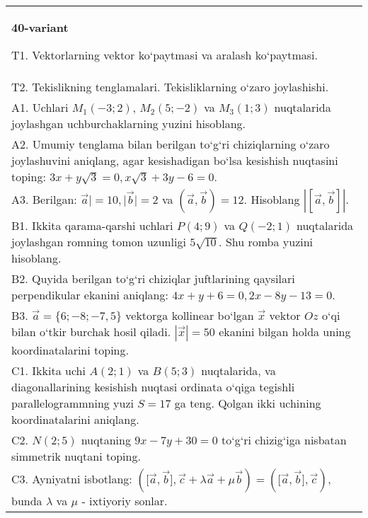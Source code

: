 \documentclass{article}
\begin{document}
\begin{tabular}{m{17cm}}
\textbf{40-variant}
\newline

T1. 
Vektorlarning vektor ko‘paytmasi va aralash ko‘paytmasi.
 \\
T2. 
Tekislikning tenglamalari. Tekisliklarning o‘zaro joylashishi.
 \\
A1. 
Uchlari $M_1 (-3;2) $, $M_2 (5;-2) $ va $M_3 (1;3) $
nuqtalarida joylashgan uchburchaklarning yuzini hisoblang.
 \\
A2. 
Umumiy tenglama bilan berilgan to‘g‘ri chiziqlarning
o‘zaro joylashuvini aniqlang, agar kesishadigan bo‘lsa kesishish nuqtasini
toping: $3x+y\sqrt{3}=0, x\sqrt{3}+3y-6=0$.
 \\
A3. 
Berilgan: $\overrightarrow{a}| = 10,|\overrightarrow{b}| = 2$ va
$\left(\overrightarrow{a},\overrightarrow{b} \right) = 12$. Hisoblang
$\left| \left\lbrack \overrightarrow{a},\overrightarrow{b} \right\rbrack \right|$.
 \\
B1. Ikkita qarama-qarshi uchlari \(P (4;9) \) va \(Q (-2; 1) \) nuqtalarida joylashgan romning tomon uzunligi \(5\sqrt{10}\). Shu
romba yuzini hisoblang.
 \\
B2. 
Quyida berilgan to‘g‘ri chiziqlar juftlarining qaysilari
perpendikular ekanini aniqlang: $4x+y+6=0, 2x-8y-13=0$.
 \\
B3. 
$\vec{a} = \{ 6; - 8; - 7,5\}$ vektorga kollinear bo‘lgan $\vec{x}$ vektor $Oz$ o‘qi bilan o‘tkir burchak hosil qiladi. $|\vec{x}| = 50$ ekanini bilgan holda uning koordinatalarini toping.
 \\
C1. 
Ikkita uchi \(A (2;1) \) va \(B (5; 3) \) nuqtalarida, va
diagonallarining kesishish nuqtasi ordinata o‘qiga tegishli
parallelogrammning yuzi \(S = 17\) ga teng. Qolgan ikki uchining
koordinatalarini aniqlang. \\
C2. 
\(N (2; 5) \) nuqtaning \(9x - 7y + 30 = 0\) to‘g‘ri chizig‘iga
nisbatan simmetrik nuqtani toping.
 \\
C3. 
Ayniyatni isbotlang: \((\lbrack\vec{a},\vec{b}\rbrack,\vec{c} + \lambda\vec{a} + \mu\vec{b}) = (\lbrack\vec{a},\vec{b}\rbrack,\vec{c}) \), bunda \(\lambda\) va \(\mu\) - ixtiyoriy sonlar. \\

\end{tabular}
\vspace{1cm}
\end{document}
